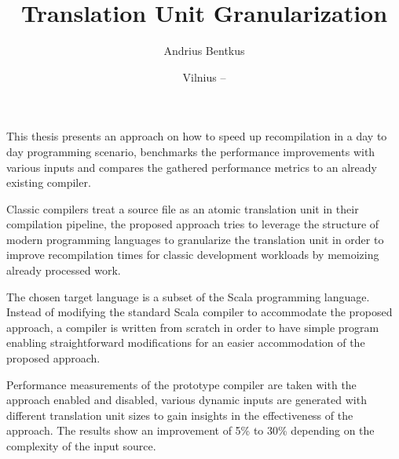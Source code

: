 \documentclass{VUMIFPSbakalaurinis}
\institute{Informatikos institutas}  %
\title{Translation Unit Granularization}
\author{Andrius Bentkus}
\date{Vilnius – \the\year}
\begin{document}
\maketitle


\addtocounter{page}{1}

This thesis presents an approach on how to speed up recompilation in a day to day programming scenario, benchmarks the performance improvements with various inputs and compares the gathered performance metrics to an already existing compiler.

Classic compilers treat a source file as an atomic translation unit in their compilation pipeline, the proposed approach tries to leverage the structure of modern programming languages to granularize the translation unit in order to improve recompilation times for classic development workloads by memoizing already processed work.

The chosen target language is a subset of the Scala programming language.
Instead of modifying the standard Scala compiler to accommodate the proposed approach, a compiler is written from scratch in order to have simple program enabling straightforward modifications for an easier accommodation of the proposed approach.

Performance measurements of the prototype compiler are taken with the approach enabled and disabled, various dynamic inputs are generated with different translation unit sizes to gain insights in the effectiveness of the approach. The results show an improvement of 5\% to 30\% depending on the complexity of the input source.





\tableofcontents

\end{document}
